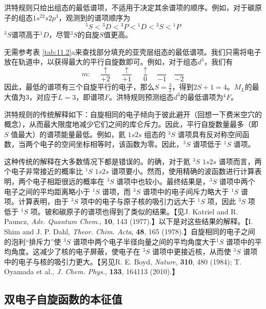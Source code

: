     洪特规则只给出组态的最低谱项，不适用于决定其余谱项的顺序。例如，对于碳原子的组态$1s^22s2p^3$，观测到的谱项顺序为
    \begin{equation*}
        \left. ^5S \right. < \left. ^3D \right. < \left. ^3P \right. < \left. ^1D \right. < \left. ^3S \right. < \left. ^1P \right.
    \end{equation*}
    $^3S$谱项高于$^1D$，尽管$^3S$的自旋$S$值更高。

    无需参考表 \ref{tab:11.2}a来查找部分填充的亚壳层组态的最低谱项。我们只需将电子放在轨道中，以获得最大的平行自旋数即可。例如，对于组态$d^3$，我们有
    \begin{equation}
        m : \quad \frac{\uparrow}{+2} \quad \frac{\uparrow}{+1} \quad \frac{\uparrow}{0} \quad \frac{}{-1} \quad \frac{}{-2}
        \label{eq:11.48}
    \end{equation}
    因此，最低的谱项有三个自旋平行的电子，那么$S = \frac{3}{2}$，得到$2S + 1 = 4$。$M_L$的最大值为$3$，对应于$L=3$，即谱项$F$。洪特规则预测组态$d^3$的最低谱项为$^4F$。

    洪特规则的传统解释如下：自旋相同的电子倾向于彼此避开（回想一下费米空穴的概念），从而最大限度地减少它们之间的库仑斥力。因此，平行自旋数量最多（即 $S$ 值最大）的谱项能量最低。例如，氦 $1s2s$ 组态的 $^3S$ 谱项具有反对称空间函数，当两个电子的空间坐标相等时，该函数为零。因此，$^3S$ 谱项低于 $^1S$ 谱项。

    这种传统的解释在大多数情况下都是错误的。的确，对于氦 $^3S$ $1s2s$ 谱项而言，两个电子非常接近的概率比 $^1S$ $1s2s$ 谱项要小。然而，使用精确的波函数进行计算表明，两个电子相距很远的概率在 $^3S$ 谱项中也较小。最终结果是，$^3S$ 谱项中两个电子之间的平均距离略小于 $^1S$ 谱项，而 $^3S$ 谱项中的电子间斥力略大于 $^1S$ 谱项。计算表明，由于 $^3S$ 项中的电子与原子核的吸引力远大于 $^1S$ 项，因此 $^3S$ 项低于 $^1S$ 项。铍和碳原子的谱项也得到了类似的结果。【见J. Katriel and R. Pauncz, \textit{Adv. Quantum Chem.}, \textbf{10}, 143 (1977).】以下是对这些结果的解释。【I. Shim and J. P. Dahl, \textit{Theor. Chim. Acta}, \textbf{48}, 165 (1978).】自旋相同的电子之间的泡利“排斥力”使 $^3S$ 谱项中两个电子半径向量之间的平均角度大于$^1S$ 谱项中的平均角度。这减少了核的电子屏蔽，使电子在 $^3S$ 谱项中更接近核，从而使 $^3S$ 谱项中的电子与核的吸引力更大。【另见R. E. Boyd, \textit{Nature}, \textbf{310}, 480 (1984); T. Oyamada et al., \textit{J. Chem. Phys.}, \textbf{133}, 164113 (2010).】

\subsection*{双电子自旋函数的本征值}

